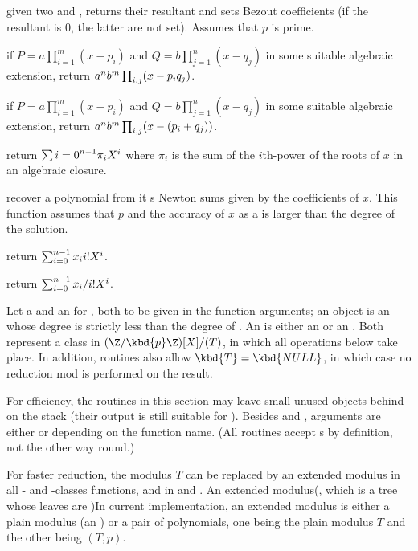 given two   and ,
returns their resultant and sets Bezout coefficients (if the resultant is $0$,
the latter are not set). Assumes that $p$ is prime.

 if
$P=a\prod_{i=1}^m(x-p_i)$ and $Q=b\prod_{j=1}^n(x-q_j)$ in some suitable
algebraic extension, return $a^n\*b^m\prod_{i,j}(x-p_i\*q_j)$.

 if
$P=a\prod_{i=1}^m(x-p_i)$ and $Q=b\prod_{j=1}^n(x-q_j)$ in some suitable
algebraic extension, return $a^n\*b^m\prod_{i,j}(x-(p_i+q_j))$.

 return
$\sum{i=0}^{n-1} \pi_i\*X^i$ where $\pi_i$ is the sum of the $i$th-power
of the roots of $x$ in an algebraic closure.

 recover a polynomial from it
s Newton sums given by the coefficients of $x$.
This function assumes that $p$ and the accuracy of $x$ as a  is
larger than the degree of the solution.

 return
$\sum_{i=0}^{n-1} x_i\*i!\*X^i$.

 return
$\sum_{i=0}^{n-1} x_i/{i!}\*X^i$.

 Let  a  and  an
 for , both to be given in the function arguments; an 
object is an  whose degree is strictly less than the degree of
. An  is either an  or an . Both represent
a class in $(\Z/\kbd{p}\Z)[X] / (T)$, in which all operations below take
place. In addition,  routines also allow $\kbd{T} = \kbd{NULL}$, in
which case no reduction mod  is performed on the result.

For efficiency, the routines in this section may leave small unused objects
behind on the stack (their output is still suitable for ).
Besides  and , arguments are either  or 
depending on the function name. (All  routines accept s by
definition, not the other way round.)


For faster reduction, the modulus $T$ can be replaced by an extended modulus
in all - and -classes functions, and in  and
. An extended modulus(, which is a tree whose leaves are )In
current implementation, an extended modulus is either a plain modulus (an
) or a pair of polynomials, one being the plain modulus $T$ and the
other being $(T,p)$.

